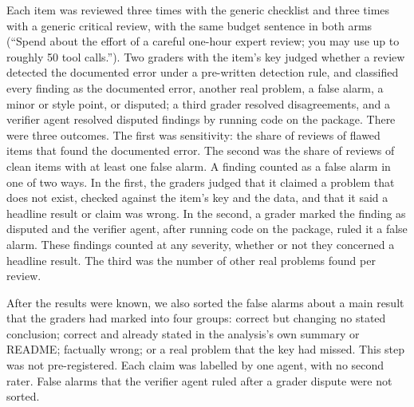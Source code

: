 Each item was reviewed three times with the generic checklist and three
times with a generic critical review, with the same budget sentence in
both arms (``Spend about the effort of a careful one-hour expert review;
you may use up to roughly 50 tool calls.''). Two graders with the item's key judged
whether a review detected the documented error under a pre-written
detection rule, and classified every finding as the documented error,
another real problem, a false alarm, a minor or style point, or disputed;
a third grader resolved disagreements, and a verifier agent resolved
disputed findings by running code on the package. There were three
outcomes. The first was sensitivity: the share of reviews of flawed items
that found the documented error. The second was the share of reviews of
clean items with at least one false alarm. A finding counted as a false
alarm in one of two ways. In the first, the graders judged that it
claimed a problem that does not exist, checked against the item's key and
the data, and that it said a headline result or claim was wrong. In the
second, a grader marked the finding as disputed and the verifier agent,
after running code on the package, ruled it a false alarm. These findings
counted at any severity, whether or not they concerned a headline result.
The third was the number of other real problems found per review.

After the results were known, we also sorted the false alarms about a
main result that the graders had marked into four groups: correct but
changing no stated conclusion; correct and already stated in the
analysis's own summary or README; factually wrong; or a real problem that
the key had missed. This step was not pre-registered. Each claim was
labelled by one agent, with no second rater. False alarms that the
verifier agent ruled after a grader dispute were not sorted.


